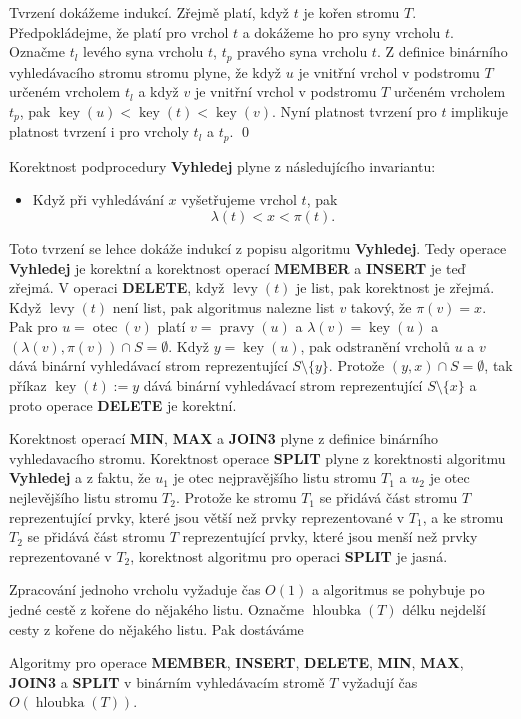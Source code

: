 \documentclass[a4paper,12pt]{article}
\DeclareMathOperator*{\otec}{otec}
\DeclareMathOperator*{\levy}{levy}
\DeclareMathOperator*{\pravy}{pravy}
\DeclareMathOperator*{\key}{key}
\DeclareMathOperator*{\hloubka}{hloubka}
\begin{document}
Tvrzení dokážeme indukcí.  Zřejmě platí, 
když $t$ je kořen stromu $T$.  Předpokládej\-me, že platí pro vrchol 
$t$ a doká\-že\-me ho pro syny vrcholu $t$.  Označme $t_l$ levého syna 
vrcholu $t$, $t_p$ pravého syna vrcholu $t$.  Z definice binárního 
vyhledávacího stromu stromu plyne, že když $u$ je vnitřní 
vrchol v podstromu $T$ určeném vrcholem $t_l$ a když $v$ je vnitřní 
vrchol v podstromu $T$ určeném vrcholem $t_p$, pak 
$\key(u)<\key(t)<\key(v)$.  Nyní platnost tvrzení pro $t$ 
implikuje platnost tvrzení i pro vrcholy $t_l$ a $t_p$.  \qed
\enddemo

Korektnost podprocedury {\bf Vyhledej} plyne z 
následujícího invariantu:
\begin{itemize}
\item
Když při vyhledávání $x$ vyšetřujeme vrchol $
t$, pak 
$$\lambda (t)<x<\pi (t).$$
\end{itemize}
Toto tvrzení se lehce dokáže indukcí z popisu algoritmu 
{\bf Vy\-hledej}.  Tedy operace {\bf Vy\-hledej} je korektní a korekt\-nost 
ope\-rací {\bf MEMBER} a {\bf INSERT} je teď zřejmá. V operaci {\bf DELE\-TE},  
když $\levy(t)$ je list, pak korektnost je zřejmá. Když $\levy
(t)$ 
není list, pak algoritmus nalezne list $v$ takový, že $\pi(v)=x$. 
Pak pro $u=\otec(v)$ platí $v=\pravy(u)$ a $\lambda(v)=\key(u)$ a 
$(\lambda(v),\pi(v))\cap S=\emptyset$. Když $y=\key(u)$, pak 
odstranění vrcholů $u$ a $v$ dává binární vyhledávací strom reprezentující $S\setminus \{y\}$. 
Protože $(y,x)\cap S=\emptyset$, tak příkaz $\key(t):=y$ dává binární 
vyhledávací strom reprezentující $S\setminus \{x\}$ a proto operace 
{\bf DELETE} je korektní. 

Korektnost operací {\bf MIN}, {\bf MAX} a {\bf JOIN3} plyne z definice 
binárního vyhledavacího stromu.  Korektnost operace {\bf SPLIT }
plyne z korektnosti algoritmu {\bf Vyhledej} a z faktu, že $u_
1$ je otec 
nej\-pravějšího listu stromu $T_1$ a $u_2$ je otec nejlevějšího listu stromu $T_2$.  
Protože ke stromu $T_1$ se přidává část stromu $T$ reprezentující 
prvky, které jsou větší než prvky reprezentované v $
T_1$, a ke 
stromu $T_2$ se přidává část stromu $T$ reprezentující prvky, 
které jsou menší než prvky reprezentované v $T_2$, korektnost 
algoritmu pro operaci {\bf SPLIT} je jasná.  

Zpracování jednoho vrcholu vyžaduje čas $O(
1)$ a 
algoritmus se pohybuje po jedné cestě z kořene do 
nějakého listu. Označme $\hloubka(T)$ délku nejdelší cesty 
z kořene do nějakého listu. Pak dostáváme

Algoritmy pro operace {\bf MEMBER}, {\bf INSERT}, {\bf DE\-LE\-TE}, {\bf MIN}, {\bf MAX}, 
{\bf JOIN3} a {\bf SPLIT} v binár\-ním vy\-hledá\-va\-cím stro\-mě $
T$ vyžadují 
čas $O(\hloubka(T))$. 
\endproclaim
\end{document}
